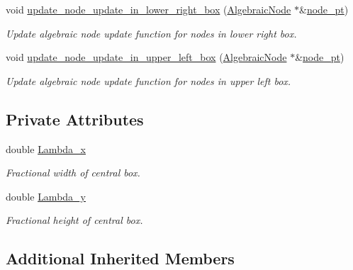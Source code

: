 \begin{DoxyCompactItemize}
void \hyperlink{classoomph_1_1AlgebraicRefineableQuarterCircleSectorMesh_a77154a45d65fa66d220bad2a3e860c8e}{update\+\_\+node\+\_\+update\+\_\+in\+\_\+lower\+\_\+right\+\_\+box} (\hyperlink{classoomph_1_1AlgebraicNode}{Algebraic\+Node} $\ast$\&\hyperlink{classoomph_1_1AlgebraicMesh_aedeebbe95d2f8e67e9939cecd1be3933}{node\+\_\+pt})
\begin{DoxyCompactList}\small\item\em Update algebraic node update function for nodes in lower right box. \end{DoxyCompactList}\item 
void \hyperlink{classoomph_1_1AlgebraicRefineableQuarterCircleSectorMesh_ab1e4847ffef953e66aafff14f35b7141}{update\+\_\+node\+\_\+update\+\_\+in\+\_\+upper\+\_\+left\+\_\+box} (\hyperlink{classoomph_1_1AlgebraicNode}{Algebraic\+Node} $\ast$\&\hyperlink{classoomph_1_1AlgebraicMesh_aedeebbe95d2f8e67e9939cecd1be3933}{node\+\_\+pt})
\begin{DoxyCompactList}\small\item\em Update algebraic node update function for nodes in upper left box. \end{DoxyCompactList}\end{DoxyCompactItemize}
\subsection*{Private Attributes}
\begin{DoxyCompactItemize}
\item 
double \hyperlink{classoomph_1_1AlgebraicRefineableQuarterCircleSectorMesh_aed38fed1e464c86e3dedd377e2459de7}{Lambda\+\_\+x}
\begin{DoxyCompactList}\small\item\em Fractional width of central box. \end{DoxyCompactList}\item 
double \hyperlink{classoomph_1_1AlgebraicRefineableQuarterCircleSectorMesh_a2690e44e43dd4ed1e45b02f4b71ae43f}{Lambda\+\_\+y}
\begin{DoxyCompactList}\small\item\em Fractional height of central box. \end{DoxyCompactList}\end{DoxyCompactItemize}
\subsection*{Additional Inherited Members}


